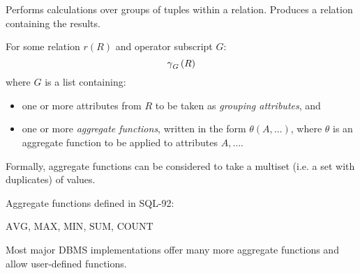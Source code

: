 \begin{multicols}{2}
\begin{CheatsheetEntryFrame}

        Performs calculations over groups of tuples within a relation. Produces a relation containing the results.

        For some relation $r(R)$ and operator subscript $G$:
        \begin{equation*}
            \operatorname{\gamma}_G{(R)}
        \end{equation*}
        where $G$ is a list containing:
        \begin{itemize}
            \item one or more attributes from $R$ to be taken as \textit{grouping attributes}, and
            \item one or more \textit{aggregate functions}, written in the form $\theta{(A, \dots)}$, where $\theta$ is an aggregate function to be applied to attributes $A, \dots$.
        \end{itemize}


        Formally, aggregate functions can be considered to take a multiset (i.e. a set with duplicates) of values.

        Aggregate functions defined in SQL-92:
        \begin{center}
            $\text{AVG}$, $\text{MAX}$, $\text{MIN}$, $\text{SUM}$, $\text{COUNT}$
        \end{center}
        Most major DBMS implementations offer many more aggregate functions and allow user-defined functions.


\end{CheatsheetEntryFrame}
\end{multicols}
